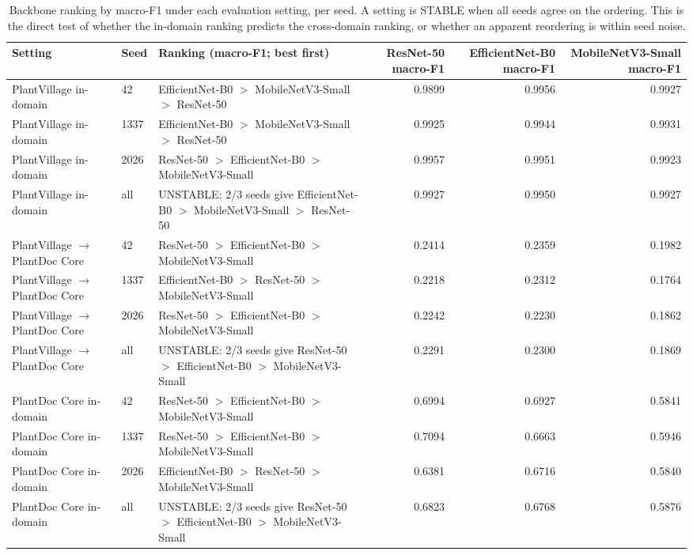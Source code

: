 \begin{table}[htbp]
\caption{Backbone ranking by macro-F1 under each evaluation setting, per seed. A setting is STABLE when all seeds agree on the ordering. This is the direct test of whether the in-domain ranking predicts the cross-domain ranking, or whether an apparent reordering is within seed noise.}
\label{tab:ranking-stability}
\begin{tabular}{lllrrr}
\toprule
Setting & Seed & Ranking (macro-F1; best first) & ResNet-50 macro-F1 & EfficientNet-B0 macro-F1 & MobileNetV3-Small macro-F1 \\
\midrule
PlantVillage in-domain & 42 & EfficientNet-B0 $>$ MobileNetV3-Small $>$ ResNet-50 & 0.9899 & 0.9956 & 0.9927 \\
PlantVillage in-domain & 1337 & EfficientNet-B0 $>$ MobileNetV3-Small $>$ ResNet-50 & 0.9925 & 0.9944 & 0.9931 \\
PlantVillage in-domain & 2026 & ResNet-50 $>$ EfficientNet-B0 $>$ MobileNetV3-Small & 0.9957 & 0.9951 & 0.9923 \\
PlantVillage in-domain & all & UNSTABLE: 2/3 seeds give EfficientNet-B0 $>$ MobileNetV3-Small $>$ ResNet-50 & 0.9927 & 0.9950 & 0.9927 \\
PlantVillage $\rightarrow$ PlantDoc Core & 42 & ResNet-50 $>$ EfficientNet-B0 $>$ MobileNetV3-Small & 0.2414 & 0.2359 & 0.1982 \\
PlantVillage $\rightarrow$ PlantDoc Core & 1337 & EfficientNet-B0 $>$ ResNet-50 $>$ MobileNetV3-Small & 0.2218 & 0.2312 & 0.1764 \\
PlantVillage $\rightarrow$ PlantDoc Core & 2026 & ResNet-50 $>$ EfficientNet-B0 $>$ MobileNetV3-Small & 0.2242 & 0.2230 & 0.1862 \\
PlantVillage $\rightarrow$ PlantDoc Core & all & UNSTABLE: 2/3 seeds give ResNet-50 $>$ EfficientNet-B0 $>$ MobileNetV3-Small & 0.2291 & 0.2300 & 0.1869 \\
PlantDoc Core in-domain & 42 & ResNet-50 $>$ EfficientNet-B0 $>$ MobileNetV3-Small & 0.6994 & 0.6927 & 0.5841 \\
PlantDoc Core in-domain & 1337 & ResNet-50 $>$ EfficientNet-B0 $>$ MobileNetV3-Small & 0.7094 & 0.6663 & 0.5946 \\
PlantDoc Core in-domain & 2026 & EfficientNet-B0 $>$ ResNet-50 $>$ MobileNetV3-Small & 0.6381 & 0.6716 & 0.5840 \\
PlantDoc Core in-domain & all & UNSTABLE: 2/3 seeds give ResNet-50 $>$ EfficientNet-B0 $>$ MobileNetV3-Small & 0.6823 & 0.6768 & 0.5876 \\
\bottomrule
\end{tabular}
\end{table}
